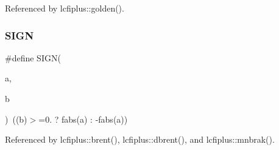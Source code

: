 Referenced by lcfiplus\+::golden().

\mbox{\label{algo_8h_ac89d5f8a358eb8a1abdcd0fcef134f1a}} 
\subsubsection{S\+I\+GN}
{\footnotesize\ttfamily \#define S\+I\+GN(\begin{DoxyParamCaption}\item[{}]{a,  }\item[{}]{b }\end{DoxyParamCaption})~((b)$>$=0. ? fabs(a) \+: -\/fabs(a))}



Referenced by lcfiplus\+::brent(), lcfiplus\+::dbrent(), and lcfiplus\+::mnbrak().

